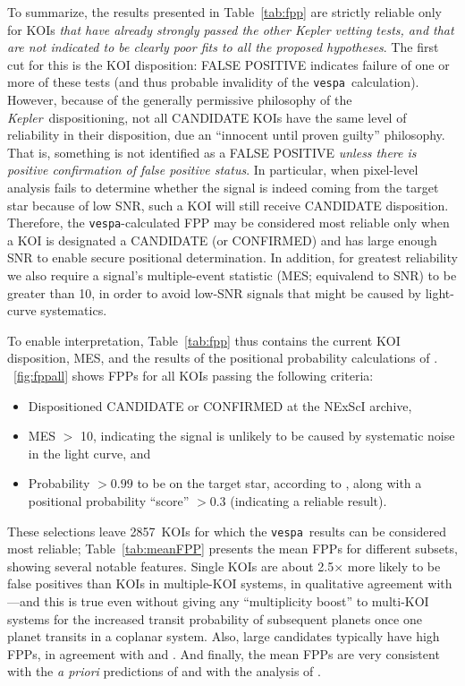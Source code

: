 \documentclass{emulateapj}
\newcommand{\figref}[1]{\ref{fig:#1}}
\newcommand{\Fig}[1]{\figurename~\figref{#1}}
\newcommand{\Tab}[1]{Table~\ref{tab:#1}}
\newcommand{\tab}[1]{\Tab{#1}}
\newcommand{\nreliable}{2857} %
\newcommand{\posprobthresh}{0.3}
\newcommand{\kepler}{\textit{Kepler}}
\newcommand{\vespa}{\texttt{vespa}}
\begin{document}


To summarize, the results presented in \tab{fpp} are strictly reliable
only for KOIs \emph{that have already strongly passed the other Kepler
vetting tests, and that are not indicated to be clearly poor fits to
all the proposed hypotheses}.  The first cut for this is the KOI
disposition: FALSE POSITIVE indicates failure of one or more of these
tests (and thus probable invalidity of the \vespa\ calculation).
However, because of the generally permissive philosophy of the
\kepler\ dispositioning, not all CANDIDATE KOIs have the same level of 
reliability in their disposition, due an ``innocent 
until proven guilty'' philosophy.
That is, something is not identified as a FALSE POSITIVE
\emph{unless there is positive confirmation of false positive status}.
In particular, when pixel-level analysis fails to determine whether
the signal is indeed coming from the target star because of low SNR,
such a KOI will still receive CANDIDATE disposition.  Therefore, the
\vespa-calculated FPP may be considered most reliable only when a KOI
is designated a CANDIDATE (or CONFIRMED) and has large enough SNR to
enable secure positional determination.  In addition, for greatest
reliability we also require a signal's multiple-event statistic (MES;
equivalend to SNR) to be greater than 10, in order to avoid low-SNR
signals that might be caused by light-curve systematics.


To enable interpretation, \tab{fpp} thus contains the current KOI
disposition, MES, and the results of the positional probability calculations
of \citet{Bryson:KSCI}.  \Fig{fppall} shows FPPs for all KOIs passing
the following criteria:
\begin{itemize}
\item Dispositioned CANDIDATE or CONFIRMED at the NExScI archive,
\item MES $>$ 10, indicating the signal is unlikely to be caused by 
      systematic noise in the light curve, and
\item Probability $> 0.99$ to be on the target star, according
  to \citet{Bryson:KSCI}, along with a positional probability
  ``score'' $> \posprobthresh$ (indicating a reliable result).  
\end{itemize}

These selections leave \nreliable\ KOIs for which the \vespa\ results
can be considered most reliable;  \Tab{meanFPP} presents the mean FPPs
for different subsets, showing several notable features.  Single KOIs
are about 2.5$\times$ more likely to be false positives than KOIs in
multiple-KOI systems, in qualitative agreement with
\citet{Lissauer:2012}---and this is true even without giving any
``multiplicity boost'' to multi-KOI systems for the increased transit
probability of subsequent planets once one planet transits in a
coplanar system.  Also, large candidates typically have high FPPs, in
agreement with \citet{Santerne:2012} and \citet{Santerne:2015}.  And
finally, the mean FPPs are very consistent with the \textit{a priori}
predictions of \citet{Morton:2011b} and with the analysis of
\citet{Fressin:2013}.
\end{document}
